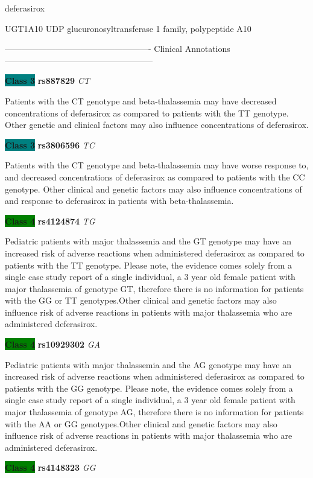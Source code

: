 \documentclass{resume} %
\begin{document}
\begin{rSection}{ deferasirox }
\begin{rSubsection}{ UGT1A10 }{ UDP glucuronosyltransferase 1 family, polypeptide A10 }{}{}
\item[]

\item[] ---------------------------------------------------- Clinical Annotations -----------------------------------------------------\newline
\item \textbf{\colorbox{teal} {Class 3}} \textbf{ rs887829 } \textit{ CT }
\item[] Patients with the CT genotype and beta-thalassemia may have decreased concentrations of deferasirox as compared to patients with the TT genotype. Other genetic and clinical factors may also influence concentrations of deferasirox.\item \textbf{\colorbox{teal} {Class 3}} \textbf{ rs3806596 } \textit{ TC }
\item[] Patients with the CT genotype and beta-thalassemia may have worse response to, and decreased concentrations of deferasirox as compared to patients with the CC genotype. Other clinical and genetic factors may also influence concentrations of and response to deferasirox in patients with beta-thalassemia.\item \textbf{\colorbox{green} {Class 4}} \textbf{ rs4124874 } \textit{ TG }
\item[] Pediatric patients with major thalassemia and the GT genotype may have an increased risk of adverse reactions when administered deferasirox as compared to patients with the TT genotype. Please note, the evidence comes solely from a single case study report of a single individual, a 3 year old female patient with major thalassemia of genotype GT, therefore there is no information for patients with the GG or TT genotypes.Other clinical and genetic factors may also influence risk of adverse reactions in patients with major thalassemia who are administered deferasirox. \item \textbf{\colorbox{green} {Class 4}} \textbf{ rs10929302 } \textit{ GA }
\item[] Pediatric patients with major thalassemia and the AG genotype may have an increased risk of adverse reactions when administered deferasirox as compared to patients with the GG genotype. Please note, the evidence comes solely from a single case study report of a single individual, a 3 year old female patient with major thalassemia of genotype AG, therefore there is no information for patients with the AA or GG genotypes.Other clinical and genetic factors may also influence risk of adverse reactions in patients with major thalassemia who are administered deferasirox.\item \textbf{\colorbox{green} {Class 4}} \textbf{ rs4148323 } \textit{ GG }

\end{rSubsection}
\end{rSection}
\end{document}
